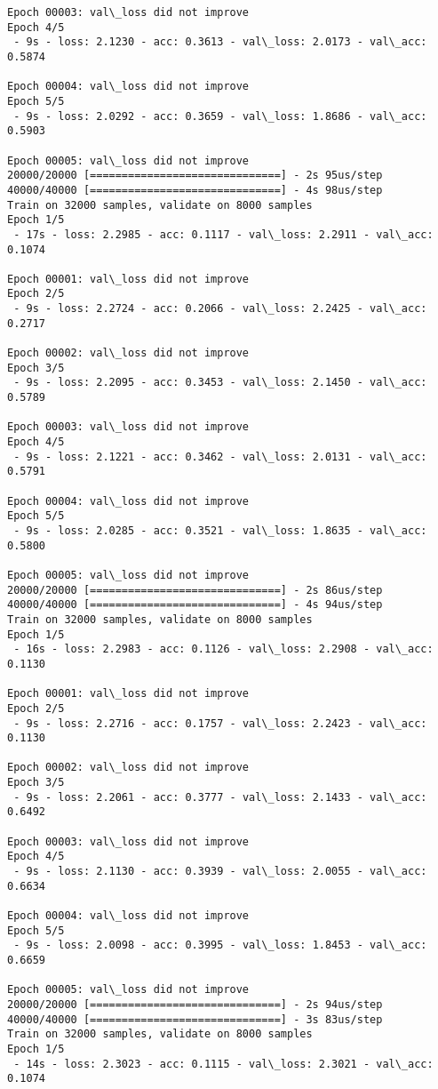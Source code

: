\documentclass[11pt]{article}
\begin{document}
\begin{Verbatim}[commandchars=\\\{\}]
Epoch 00003: val\_loss did not improve
Epoch 4/5
 - 9s - loss: 2.1230 - acc: 0.3613 - val\_loss: 2.0173 - val\_acc: 0.5874

Epoch 00004: val\_loss did not improve
Epoch 5/5
 - 9s - loss: 2.0292 - acc: 0.3659 - val\_loss: 1.8686 - val\_acc: 0.5903

Epoch 00005: val\_loss did not improve
20000/20000 [==============================] - 2s 95us/step
40000/40000 [==============================] - 4s 98us/step
Train on 32000 samples, validate on 8000 samples
Epoch 1/5
 - 17s - loss: 2.2985 - acc: 0.1117 - val\_loss: 2.2911 - val\_acc: 0.1074

Epoch 00001: val\_loss did not improve
Epoch 2/5
 - 9s - loss: 2.2724 - acc: 0.2066 - val\_loss: 2.2425 - val\_acc: 0.2717

Epoch 00002: val\_loss did not improve
Epoch 3/5
 - 9s - loss: 2.2095 - acc: 0.3453 - val\_loss: 2.1450 - val\_acc: 0.5789

Epoch 00003: val\_loss did not improve
Epoch 4/5
 - 9s - loss: 2.1221 - acc: 0.3462 - val\_loss: 2.0131 - val\_acc: 0.5791

Epoch 00004: val\_loss did not improve
Epoch 5/5
 - 9s - loss: 2.0285 - acc: 0.3521 - val\_loss: 1.8635 - val\_acc: 0.5800

Epoch 00005: val\_loss did not improve
20000/20000 [==============================] - 2s 86us/step
40000/40000 [==============================] - 4s 94us/step
Train on 32000 samples, validate on 8000 samples
Epoch 1/5
 - 16s - loss: 2.2983 - acc: 0.1126 - val\_loss: 2.2908 - val\_acc: 0.1130

Epoch 00001: val\_loss did not improve
Epoch 2/5
 - 9s - loss: 2.2716 - acc: 0.1757 - val\_loss: 2.2423 - val\_acc: 0.1130

Epoch 00002: val\_loss did not improve
Epoch 3/5
 - 9s - loss: 2.2061 - acc: 0.3777 - val\_loss: 2.1433 - val\_acc: 0.6492

Epoch 00003: val\_loss did not improve
Epoch 4/5
 - 9s - loss: 2.1130 - acc: 0.3939 - val\_loss: 2.0055 - val\_acc: 0.6634

Epoch 00004: val\_loss did not improve
Epoch 5/5
 - 9s - loss: 2.0098 - acc: 0.3995 - val\_loss: 1.8453 - val\_acc: 0.6659

Epoch 00005: val\_loss did not improve
20000/20000 [==============================] - 2s 94us/step
40000/40000 [==============================] - 3s 83us/step
Train on 32000 samples, validate on 8000 samples
Epoch 1/5
 - 14s - loss: 2.3023 - acc: 0.1115 - val\_loss: 2.3021 - val\_acc: 0.1074


\end{Verbatim}
\end{document}
